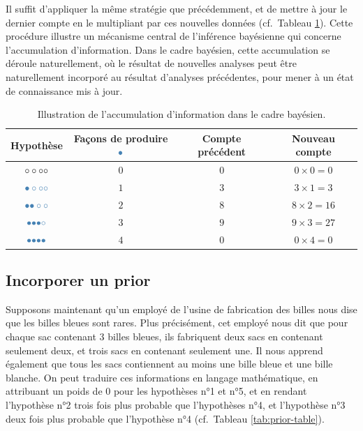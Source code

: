 \documentclass[
  a4paper,11pt,twoside,onecolumn,openright,final,oldfontcommands]{memoir}
\theoremstyle{definition}
\theoremstyle{definition}
\theoremstyle{definition}
\theoremstyle{definition}
\theoremstyle{remark}
\begin{document}
Il suffit d'appliquer la même stratégie que précédemment, et de mettre à jour le dernier compte en le multipliant par ces nouvelles données (cf.~Tableau \ref{tab:accumulation}). Cette procédure illustre un mécanisme central de l'inférence bayésienne qui concerne l'accumulation d'information. Dans le cadre bayésien, cette accumulation se déroule naturellement, où le résultat de nouvelles analyses peut être naturellement incorporé au résultat d'analyses précédentes, pour mener à un état de connaissance mis à jour.

\begin{table}[!htb]

\begin{center}
\begin{threeparttable}

\caption{\label{tab:accumulation}Illustration de l'accumulation d'information dans le cadre bayésien.}

\begin{tabular}{cccc}
\toprule
Hypothèse & Façons de produire $\color{steelblue}{\bullet}$ & Compte précédent & Nouveau compte\\
\midrule
$\LARGE \circ \circ \circ \circ$ & $0$ & $0$ & $0 \times 0 = 0$\\
$\LARGE \color{steelblue}{\bullet} \circ \circ \circ$ & $1$ & $3$ & $3 \times 1 = 3$\\
$\LARGE \color{steelblue}{\bullet} \color{steelblue}{\bullet} \circ \circ$ & $2$ & $8$ & $8 \times 2 = 16$\\
$\LARGE \color{steelblue}{\bullet} \color{steelblue}{\bullet} \color{steelblue}{\bullet} \circ$ & $3$ & $9$ & $9 \times 3 = 27$\\
$\LARGE \color{steelblue}{\bullet} \color{steelblue}{\bullet} \color{steelblue}{\bullet} \color{steelblue}{\bullet}$ & $4$ & $0$ & $0 \times 4 = 0$\\
\bottomrule
\end{tabular}

\end{threeparttable}
\end{center}

\end{table}

\hypertarget{incorporer-un-prior}{%
\subsection{Incorporer un prior}\label{incorporer-un-prior}}

Supposons maintenant qu'un employé de l'usine de fabrication des billes nous dise que les billes bleues sont rares. Plus précisément, cet employé nous dit que pour chaque sac contenant 3 billes bleues, ils fabriquent deux sacs en contenant seulement deux, et trois sacs en contenant seulement une. Il nous apprend également que tous les sacs contiennent au moins une bille bleue et une bille blanche. On peut traduire ces informations en langage mathématique, en attribuant un poids de \(0\) pour les hypothèses n°1 et n°5, et en rendant l'hypothèse n°2 trois fois plus probable que l'hypothèses n°4, et l'hypothèse n°3 deux fois plus probable que l'hypothèse n°4 (cf.~Tableau \ref{tab:prior-table}).
\end{document}
